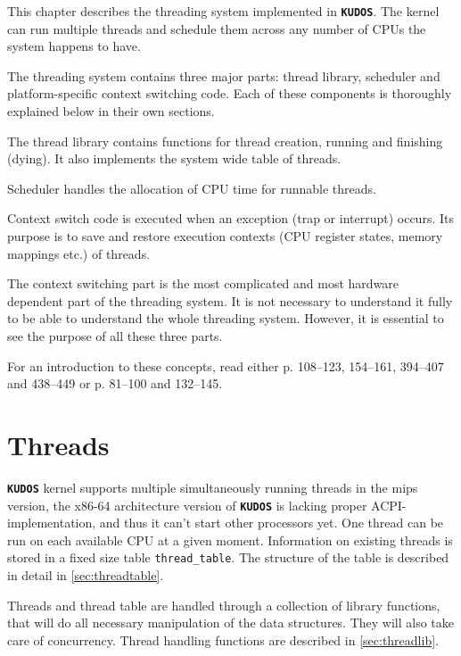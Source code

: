 \documentclass[twoside,a4paper]{report}
\newcommand{\kudos}{\texttt{\textbf{KUDOS}}}
\begin{document}

This chapter describes the threading system implemented in \kudos{}.
The kernel can run multiple threads and schedule them across any
number of CPUs the system happens to have. 

The threading system contains three major parts: thread library,
scheduler and platform-specific context switching code. 
Each of these components is thoroughly explained below in their own sections.

The thread library contains functions for thread creation, running and
finishing (dying). It also implements the system wide table of threads.

Scheduler handles the allocation of CPU time for runnable threads.

Context switch code is executed when an exception (trap or interrupt)
occurs. Its purpose is to save and restore execution contexts (CPU
register states, memory mappings etc.) of threads.

The context switching part is the most complicated and most hardware
dependent part of the threading system. It is not necessary to
understand it fully to be able to understand the whole threading
system. However, it is essential to see the purpose of all these three
parts.

For an introduction to these concepts, read either \cite{stallings} p.
108--123, 154--161, 394--407 and 438--449 or \cite{tanenbaum} p. 81--100
and 132--145.

\section{Threads}
\label{sec:threads}


\kudos{} kernel supports multiple simultaneously running threads in the 
mips version, the x86-64 architecture version of \kudos{} is lacking proper
ACPI-implementation, and thus it can't start other processors yet. One
thread can be run on each available CPU at a given moment. Information
on existing threads is stored in a fixed size table
\texttt{thread\_table}. The structure of the table is described in
detail in \autoref{sec:threadtable}.

Threads and thread table are handled through a collection of library
functions, that will do all necessary manipulation of the data
structures. They will also take care of concurrency. Thread handling
functions are described in \autoref{sec:threadlib}.
\end{document}
